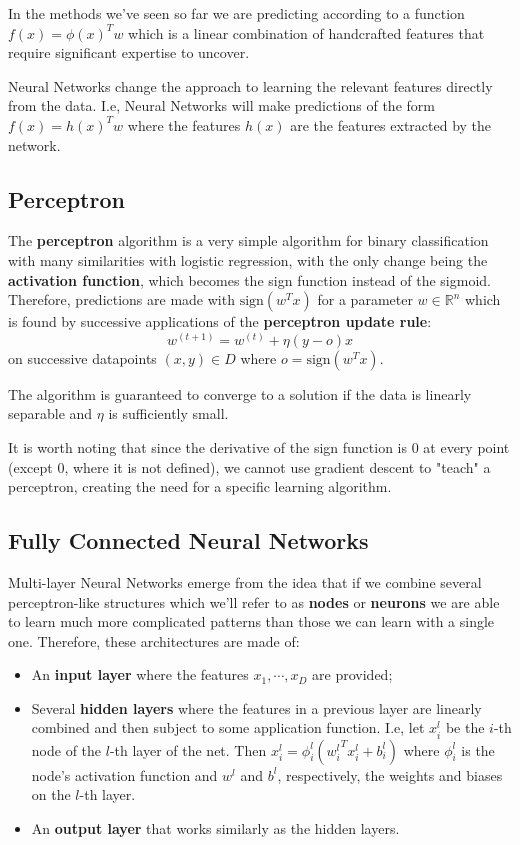 \documentclass{article}
\newcommand{\R}{\mathbb{R}}
\begin{document}
In the methods we've seen so far we are predicting according to a function $f(x) = \phi(x)^T w$ which is a linear combination of handcrafted features that require significant expertise to uncover.

Neural Networks change the approach to learning the relevant features directly from the data.
I.e, Neural Networks will make predictions of the form $f(x) = h(x)^T w$ where the features $h(x)$ are the features extracted by the network.

\subsection{Perceptron}

The \textbf{perceptron} algorithm is a very simple algorithm for binary classification with many similarities with logistic regression, with the only change being the \textbf{activation function}, which becomes the sign function instead of the sigmoid.
Therefore, predictions are made with $\text{sign}(w^T x)$ for a parameter $w \in \R^n$ which is found by successive applications of the \textbf{perceptron update rule}:
$$
w^{(t+1)} = w^{(t)} + \eta (y - o) x
$$
on successive datapoints $(x,y) \in D$ where $o = \text{sign}(w^T x)$.

The algorithm is guaranteed to converge to a solution if the data is linearly separable and $\eta$ is sufficiently small.

It is worth noting that since the derivative of the sign function is 0 at every point (except 0, where it is not defined), we cannot use gradient descent to "teach" a perceptron, creating the need for a specific learning algorithm.

\subsection{Fully Connected Neural Networks}

Multi-layer Neural Networks emerge from the idea that if we combine several perceptron-like structures which we'll refer to as \textbf{nodes} or \textbf{neurons} we are able to learn much more complicated patterns than those we can learn with a single one.
Therefore, these architectures are made of:
\begin{itemize}
    \item An \textbf{input layer} where the features $x_1, \cdots, x_D$ are provided;
    \item Several \textbf{hidden layers} where the features in a previous layer are linearly combined and then subject to some application function.
	I.e, let $x^l_i$ be the $i$-th node of the $l$-th layer of the net. Then
	$x^l_i = \phi^l_i({w^l_i}^T x^l_i + b^l_i)$
	where $\phi^l_i$ is the node's activation function and $w^l$ and $b^l$, respectively, the weights and biases on the $l$-th layer.
    \item An \textbf{output layer} that works similarly as the hidden layers.
\end{itemize}
\end{document}
